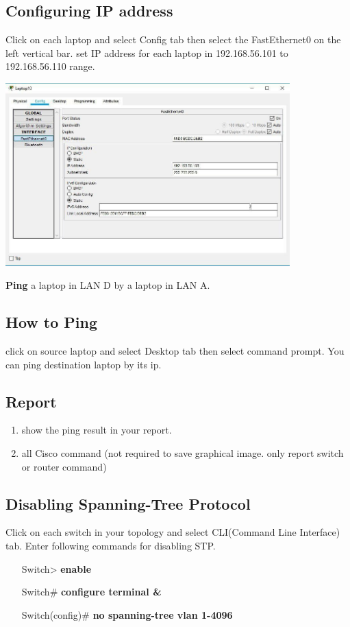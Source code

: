 \documentclass[10pt,a4paper]{article}
\numberwithin{equation}{section}
\numberwithin{figure}{section}
\numberwithin{table}{section}
\begin{document}
\subsection{Configuring IP address}
	Click  on each laptop and select Config tab then select the FastEthernet0 on the left vertical bar. set IP address for each laptop in 192.168.56.101 to 192.168.56.110 range. \\

	\begin{center}
        \includegraphics[height=200pt]{img/fig3.png}
    \end{center}
    
    \textbf{Ping} a laptop in LAN D by a laptop in LAN A.

\subsection*{How to Ping}

click on source laptop and select Desktop tab then select command prompt. You can ping destination laptop by its ip. 
\subsection*{Report}
	\begin{enumerate}
		\item show the ping result in your report.
		\item all Cisco command (not required to save graphical image. only report switch or router command)
	\end{enumerate}
    

\subsection{Disabling Spanning-Tree Protocol}
	Click on each switch in your topology and select CLI(Command Line Interface) tab. Enter following commands for disabling STP.
    \begin{itemize}
        \setlength{\itemindent}{50pt}
		\item [Switch>] \textbf{enable}
		\item [Switch\#] \textbf{configure terminal \&}
		\item [Switch(config)\#] \textbf{no spanning-tree vlan 1-4096}
	\end{itemize}
\end{document}
